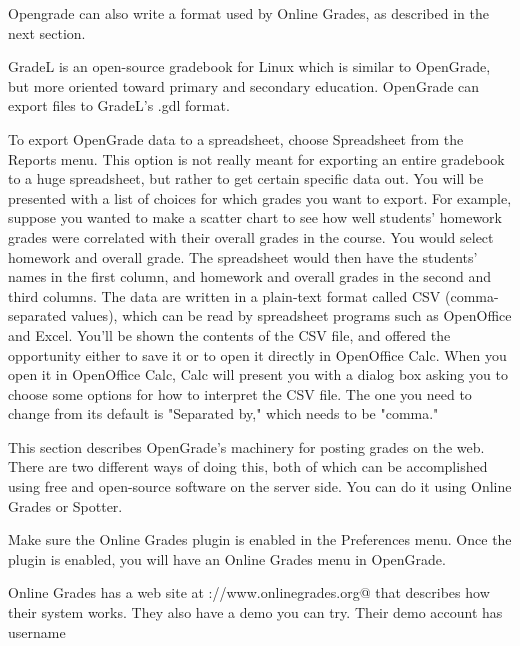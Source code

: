 \documentclass{opengrade_doc}
\begin{document}

Opengrade can also write a format used by Online Grades, as described in the next
section.


GradeL is an open-source gradebook for Linux which is similar to OpenGrade, but more
oriented toward primary and secondary education. OpenGrade can export files to
GradeL's .gdl format.


To export OpenGrade data to a spreadsheet, choose Spreadsheet from the Reports menu.
This option is not really meant for exporting an entire gradebook to a huge spreadsheet,
but rather to get certain specific data out. You will be presented with a list of
choices for which grades you want to export. For example, suppose you wanted to
make a scatter chart to see how well students' homework grades were correlated with
their overall grades in the course. You would select homework and overall grade.
The spreadsheet would then have the students' names in the first column, and homework
and overall grades in the second and third columns. The data are written in a plain-text
format called CSV (comma-separated values), which can be read by spreadsheet programs
such as OpenOffice and Excel. You'll be shown the contents of the CSV file, and offered
the opportunity either to save it or to open it directly in OpenOffice Calc. When you
open it in OpenOffice Calc, Calc will present you with a dialog box asking you to choose
some options for how to interpret the CSV file. The one you need to change from its
default is "Separated by," which needs to be "comma."

\label{web}

This section describes OpenGrade's machinery
for posting grades on the web.
There are two different ways of doing this, both of which can
be accomplished using free and open-source software on the server
side. You can do it using Online Grades or Spotter.


Make sure the Online Grades plugin is enabled in the Preferences menu.
Once the plugin is enabled, you will have an Online Grades menu in OpenGrade.

Online Grades has a web site at \verb@http://www.onlinegrades.org@ that
describes how their system works.
They also have a demo you can try.
Their demo account has username
\end{document}
